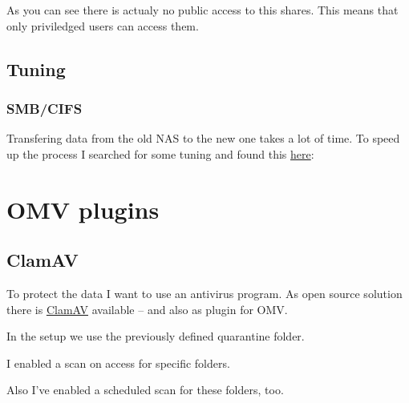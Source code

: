 
As you can see there is actualy no public access to this shares. This means
that only priviledged users can access them.

\subsection{Tuning}

\subsubsection{SMB/CIFS}

Transfering data from the old \gls{NAS} to the new one takes a lot of time. To
speed up the process I searched for some tuning and found this
\href{https://techie-show.com/open-media-vault-smb-performance-quick-win/}{here}:


\section{\gls{OMV} plugins}

\subsection{ClamAV}\label{subsec:ClamAV}

To protect the data I want to use an antivirus program. As open source solution
there is \href{https://www.clamav.net}{ClamAV} available -- and also as plugin
for \gls{OMV}.


In the setup we use the previously defined quarantine folder.


I enabled a scan on access for specific folders.


Also I've enabled a scheduled scan for these folders, too.


